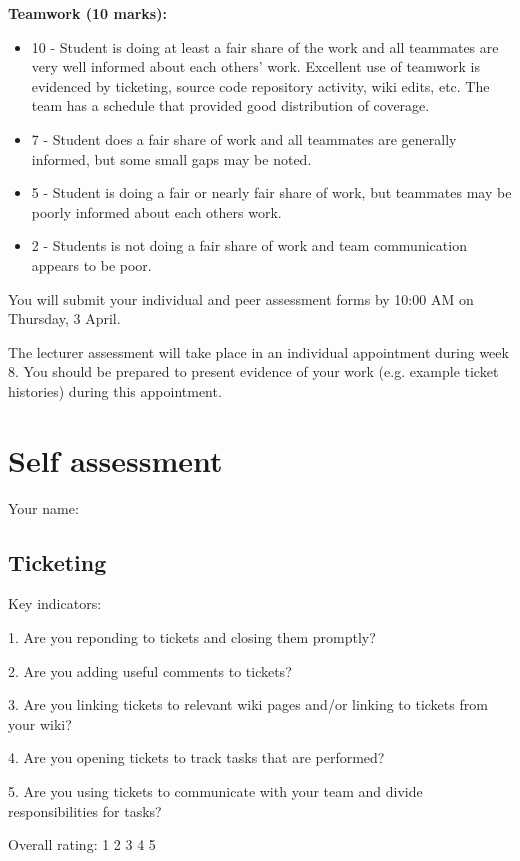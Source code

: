 \documentclass{article}   	%
\begin{document}
\textbf{Teamwork (10 marks):}
\begin{itemize}
  \item 10 - Student is doing at least a fair share of the work and all teammates are very well informed about each others' work.  Excellent use of teamwork is evidenced by ticketing, source code repository activity, wiki edits, etc.  The team has a schedule that provided good distribution of coverage.
  \item 7 -  Student does a fair share of work and all teammates are generally informed, but some small gaps may be noted.
  \item 5 -  Student is doing a fair or nearly fair share of work, but teammates may be poorly informed about each others work.
  \item 2 -  Students is not doing a fair share of work and team communication appears to be poor.
\end{itemize}

You will submit your individual and peer assessment forms by 10:00 AM on Thursday, 3 April.

The lecturer assessment will take place in an individual appointment during week 8.  You should be prepared to present evidence of your work (e.g. example ticket histories) during this appointment.

\newpage

\section*{Self assessment}

Your name: 
\vskip 1cm

\subsection*{Ticketing}

Key indicators: 

1.  Are you reponding to tickets and closing them promptly?

2.  Are you adding useful comments to tickets?

3.  Are you linking tickets to relevant wiki pages and/or linking to tickets from your wiki?

4.  Are you opening tickets to track tasks that are performed?

5.  Are you using tickets to communicate with your team and divide responsibilities for tasks?

Overall rating: \hskip 1cm 1 \hskip 1cm 2 \hskip 1cm 3 \hskip 1cm 4 \hskip 1cm 5 
\end{document}

